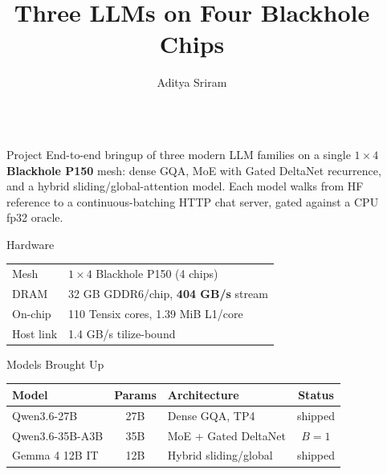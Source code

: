 \documentclass[final]{beamer}
\title{Three LLMs on Four Blackhole Chips}
\author{Aditya Sriram}
\institute[Stanford]{Department of Computer Science, Stanford University \quad
  \texttt{adisram@stanford.edu}}
\newlength{\sepwidth}
\newlength{\colwidth}
\newcommand{\separatorcolumn}{\begin{column}{\sepwidth}\end{column}}
\begin{document}
\begin{frame}[t]
\begin{columns}[t]
\separatorcolumn

\begin{column}{\colwidth}

  \begin{block}{Project}
    End-to-end bringup of three modern LLM families on a single
    \textbf{$1\times4$ Blackhole P150} mesh: dense GQA, MoE with Gated
    DeltaNet recurrence, and a hybrid sliding/global-attention model.
    Each model walks from HF reference to a continuous-batching HTTP
    chat server, gated against a CPU fp32 oracle.
  \end{block}

  \begin{block}{Hardware}
    \begin{center}\small
    \setlength{\tabcolsep}{6pt}
    \renewcommand{\arraystretch}{1.15}
    \begin{tabular}{l l}
      \toprule
      Mesh      & $1\times4$ Blackhole P150 (4 chips) \\
      DRAM      & 32 GB GDDR6/chip, \textbf{404 GB/s} stream \\
      On-chip   & 110 Tensix cores, 1.39 MiB L1/core \\
      Host link & 1.4 GB/s tilize-bound \\
      \bottomrule
    \end{tabular}
    \end{center}
  \end{block}

  \begin{block}{Models Brought Up}
    \begin{center}\small
    \setlength{\tabcolsep}{5pt}
    \renewcommand{\arraystretch}{1.15}
    \begin{tabular}{l c l c}
      \toprule
      \textbf{Model} & \textbf{Params} & \textbf{Architecture} & \textbf{Status} \\
      \midrule
      Qwen3.6-27B      & 27B & Dense GQA, TP4        & shipped \\
      Qwen3.6-35B-A3B  & 35B & MoE + Gated DeltaNet  & $B{=}1$ \\
      Gemma 4 12B IT   & 12B & Hybrid sliding/global & shipped \\
      \bottomrule
    \end{tabular}
    \end{center}
  \end{block}


\end{column}
\end{columns}
\end{frame}
\end{document}
